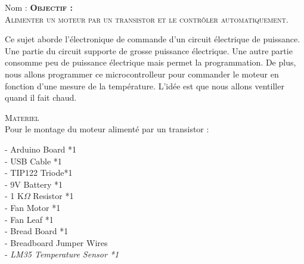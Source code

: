\documentclass[a4paper, 11pt]{article}           %
\newcommand{\objectif}[1]{\textsc{\huge \textbf{Objectif :}\\[2mm] #1} }
\newcommand{\partie}[1]{\textsc{\Large #1} }
\begin{document}
\sffamily
\hfill Nom : {\noindent\makebox[5cm]{\dotfill}\endgraf}
\objectif{Alimenter un moteur par un transistor et le contrôler automatiquement.}

Ce sujet aborde l'électronique de commande d'un circuit électrique de puissance. Une partie du circuit supporte de grosse puissance électrique. Une autre partie consomme peu de puissance électrique mais permet la programmation. De plus, nous allons programmer ce microcontrolleur pour commander le moteur en fonction d'une mesure de la température. L'idée est que nous allons ventiller quand il fait chaud.

\bigskip

\partie{Materiel} \\                      %
Pour le montage du moteur alimenté par un transistor :
\begin{multicols}{2}
- Arduino Board *1 \\
- USB Cable *1 \\
- TIP122 Triode*1  \\
- 9V Battery *1  \\
- 1 K$\Omega$ Resistor *1 \\
- Fan Motor *1 \\
- Fan Leaf *1 \\
- Bread Board *1 \\
- Breadboard Jumper Wires \\
- \emph{LM35 Temperature Sensor *1}
\end{multicols}


\bigskip
\end{document}
